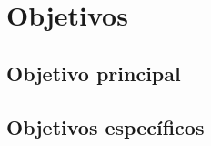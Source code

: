 \chapter{Objetivos} \label{chap:objetivos}


\section{Objetivo principal} \label{sec:objetivo_principal}


\section{Objetivos específicos} \label{sec:objetivos_especificos}

